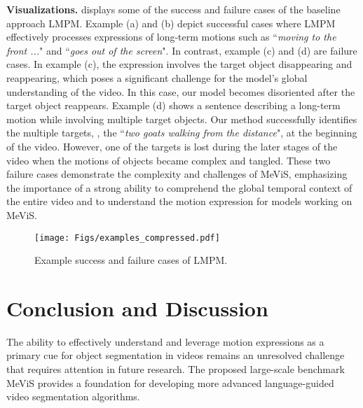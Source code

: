 \documentclass[10pt,twocolumn,letterpaper]{article}
\newcommand{\myparagraph}[1]{{\vspace{.5em} \noindent \bf #1}}
\newcommand{\ourdataset}{MeViS\xspace}
\newcommand{\ourmodel}{LMPM\xspace}
\begin{document}
\myparagraph{Visualizations.}  displays some of the success and failure cases of the baseline approach \ourmodel. Example (a) and (b) depict successful cases where \ourmodel effectively processes expressions of long-term motions such as ``\textit{moving to the front ...}" and ``\textit{goes out of the screen}". In contrast, example (c) and (d) are failure cases. In example (c), the expression involves the target object disappearing and reappearing, which poses a significant challenge for the model's global understanding of the video. In this case, our model becomes disoriented after the target object reappears. Example (d) shows a sentence describing a long-term motion while involving multiple target objects. Our method successfully identifies the multiple targets, \ie, the ``\textit{two goats walking from the distance}", at the beginning of the video. However, one of the targets is lost during the later stages of the video when the motions of objects became complex and tangled. These two failure cases demonstrate the complexity and challenges of \ourdataset, emphasizing the importance of a strong ability to comprehend the global temporal context of the entire video and to understand the motion expression for models working on \ourdataset.

\begin{figure}
    \centering
    \texttt{[image: Figs/examples\_compressed.pdf]}
    \vspace{-6.6mm}
    \caption{Example success and failure cases of \ourmodel.}
    \label{fig:visualizations}
    \vspace{-3mm}
\end{figure} \section{Conclusion and Discussion}

The ability to effectively understand and leverage motion expressions as a primary cue for object segmentation in videos remains an unresolved challenge that requires attention in future research. The proposed large-scale benchmark {\ourdataset} provides a foundation for developing more advanced language-guided video segmentation algorithms.
\end{document}
